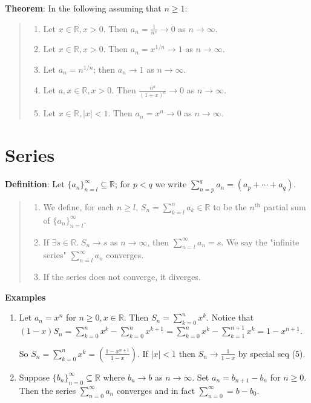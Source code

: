 \documentclass[11pt]{article}
\begin{document}
\textbf{Theorem}: In the following assuming that $n \geq 1$:
\begin{quote}\vspace{-0.3cm}
	\begin{enumerate}
	\item Let $x \in \mathbb{R}, x > 0$. Then $a_n = \frac{1}{n^x} \to 0$ as $n \to \infty$.
	\item Let $x \in \mathbb{R}, x > 0$. Then $a_n = x^{1/n} \to 1$ as $n \to \infty$.
	\item Let $a_n = n^{1/n}$; then $a_n \to 1$ as $n \to \infty$.
	\item Let $a,x \in \mathbb{R}, x > 0$. Then $\frac{n^a}{(1+x)^a} \to 0$ as $n \to \infty$.
	\item Let $x \in \mathbb{R}, |x| < 1$. Then $a_n = x^n \to 0$ as $n \to \infty$.
	\end{enumerate}
\end{quote}

\section{Series}

\textbf{Definition}: Let $\{a_n\}_{n=l}^\infty \subseteq \mathbb{R}$; for $p < q$ we write $\sum_{n=p}^q a_n = (a_p + \cdots + a_q)$.
\begin{quote}\vspace{-0.3cm}
	\begin{enumerate}
	\item We define, for each $n \geq l$, $S_n = \sum\limits_{k=l}^n a_k \in \mathbb{R}$ to be the $n^\text{th}$ partial sum of $\{a_n\}_{n=l}^\infty$.
	\item If $\exists s \in \mathbb{R}.\; S_n \to s$ as $n \to \infty$, then $\sum_{n=l}^\infty a_n = s$. We say the "infinite series" $\sum_{n=l}^\infty a_n$ converges.
	\item If the series does not converge, it diverges.
	\end{enumerate}
\end{quote}

\textbf{Examples}
\begin{enumerate}\vspace{-0.3cm}
	\item Let $a_n = x^n$ for $n \geq 0, x \in \mathbb{R}$. Then $S_n = \sum_{k=0}^n x^k$. Notice that $(1-x)S_n = \sum_{k=0}^n x^k - \sum_{k=0}^n x^{k+1} = \sum_{k=0}^n x^k - \sum_{k=1}^{n+1} x^k = 1-x^{n+1}$.

So $S_n = \sum_{k=0}^n x^k = (\frac{1-x^{n+1}}{1-x})$. If $|x| < 1$ then $S_n \to \frac{1}{1-x}$ by special seq (5).

	\item Suppose $\{b_n\}_{n=0}^\infty \subseteq \mathbb{R}$ where $b_n \to b$ as $n \to \infty$. Set $a_n = b_{n+1}-b_n$ for $n \geq 0$. Then the series $\sum_{n=0}^\infty a_n$ converges and in fact $\sum_{n=0}^\infty = b - b_0$.
\end{enumerate}
\end{document}

